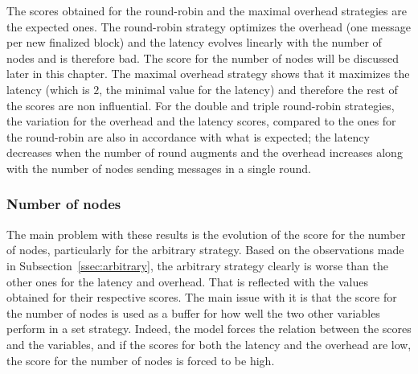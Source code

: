 \begin{table}
\end{table}

The scores obtained for the round-robin and the maximal overhead strategies are
the expected ones. The round-robin strategy optimizes the overhead (one message
per new finalized block) and the latency evolves linearly with the number of
nodes and is therefore bad. The score for the number of nodes will be discussed
later in this chapter. The maximal overhead strategy shows that it maximizes the
latency (which is \(2\), the minimal value for the latency) and therefore the
rest of the scores are non influential.
For the double and triple round-robin strategies, the variation for the overhead
and the latency scores, compared to the ones for the round-robin are also in
accordance with what is expected; the latency decreases when the number of round
augments and the overhead increases along with the number of nodes sending
messages in a single round.

\subsubsection{Number of nodes}
The main problem with these results is the evolution of the score for the number
of nodes, particularly for the arbitrary strategy. Based on the observations
made in Subsection~\ref{ssec:arbitrary}, the arbitrary strategy clearly is worse than the other ones for
the latency and overhead. That is reflected with the values obtained for their
respective scores. The main issue with it is that the score for the number of
nodes is used as a buffer for how well the two other variables perform in a set
strategy. Indeed, the model forces the relation between the scores and the
variables, and if the scores for both the latency and the overhead are low, the
score for the number of nodes is forced to be high.

